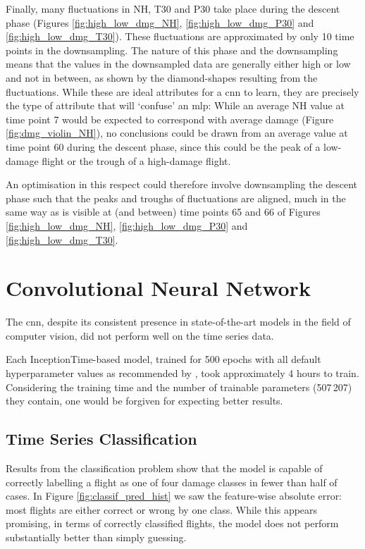 Finally, many fluctuations in NH, T30 and P30 take place during the descent phase (Figures \ref{fig:high_low_dmg_NH}, \ref{fig:high_low_dmg_P30} and \ref{fig:high_low_dmg_T30}). These fluctuations are approximated by only 10 time points in the downsampling. The nature of this phase and the downsampling means that the values in the downsampled data are generally either high or low and not in between, as shown by the diamond-shapes resulting from the fluctuations. While these are ideal attributes for a \ac{cnn} to learn, they are precisely the type of attribute that will `confuse' an \ac{mlp}: While an average NH value at time point 7 would be expected to correspond with average damage (Figure \ref{fig:dmg_violin_NH}), no conclusions could be drawn from an average value at time point 60 during the descent phase, since this could be the peak of a low-damage flight or the trough of a high-damage flight.

An optimisation in this respect could therefore involve downsampling the descent phase such that the peaks and troughs of fluctuations are aligned, much in the same way as is visible at (and between) time points 65 and 66 of Figures \ref{fig:high_low_dmg_NH}, \ref{fig:high_low_dmg_P30} and \ref{fig:high_low_dmg_T30}.

\section{Convolutional Neural Network}
The \ac{cnn}, despite its consistent presence in state-of-the-art models in the field of computer vision, did not perform well on the time series data.

Each InceptionTime-based model, trained for 500 epochs with all default hyperparameter values as recommended by \citet[]{fawaz_inceptiontime_2019}, took approximately 4 hours to train. Considering the training time and the number of trainable parameters (507\,207) they contain, one would be forgiven for expecting better results.

\subsection{Time Series Classification}
Results from the classification problem show that the model is capable of correctly labelling a flight as one of four damage classes in fewer than half of cases. In Figure \ref{fig:classif_pred_hist} we saw the feature-wise absolute error: most flights are either correct or wrong by one class. While this appears promising, in terms of correctly classified flights, the model does not perform substantially better than simply guessing.

